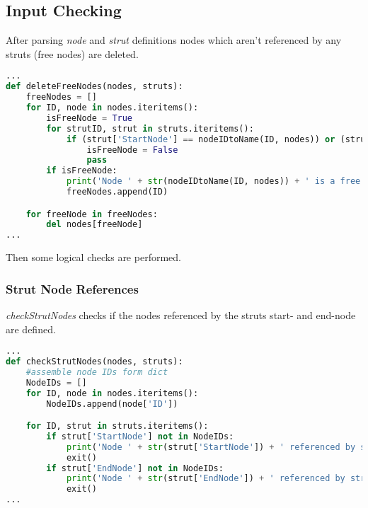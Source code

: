 \subsection{Input Checking}
\label{sec:inputcheck}

After parsing \textit{node} and \textit{strut} definitions nodes which aren't referenced by any struts (free nodes) are deleted. 

\begin{inconsolata}
\begin{minipage}{\linewidth}
\begin{lstlisting}[language=python]
...
def deleteFreeNodes(nodes, struts):
    freeNodes = []
    for ID, node in nodes.iteritems():
        isFreeNode = True
        for strutID, strut in struts.iteritems():
            if (strut['StartNode'] == nodeIDtoName(ID, nodes)) or (strut['EndNode'] == nodeIDtoName(ID, nodes)):
                isFreeNode = False
                pass
        if isFreeNode:
            print('Node ' + str(nodeIDtoName(ID, nodes)) + ' is a free node and will be deleted.')
            freeNodes.append(ID)

    for freeNode in freeNodes:
        del nodes[freeNode]
...
\end{lstlisting}
\end{minipage}
\end{inconsolata}

Then some logical checks are performed.

\pagebreak

\subsubsection{Strut Node References}
\label{sec:inputcheck-checkStrutNodes}

\textit{checkStrutNodes} checks if the nodes referenced by the struts start- and end-node are defined.

\begin{inconsolata}
\begin{minipage}{\linewidth}
\begin{lstlisting}[language=python]
...
def checkStrutNodes(nodes, struts):
    #assemble node IDs form dict
    NodeIDs = []
    for ID, node in nodes.iteritems():
        NodeIDs.append(node['ID'])

    for ID, strut in struts.iteritems():
        if strut['StartNode'] not in NodeIDs:
            print('Node ' + str(strut['StartNode']) + ' referenced by strut ' + str(strut['ID']) + ' but not defined.')
            exit()
        if strut['EndNode'] not in NodeIDs:
            print('Node ' + str(strut['EndNode']) + ' referenced by strut ' + str(strut['ID']) + ' but not defined.')
            exit()
...
\end{lstlisting}
\end{minipage}
\end{inconsolata}

